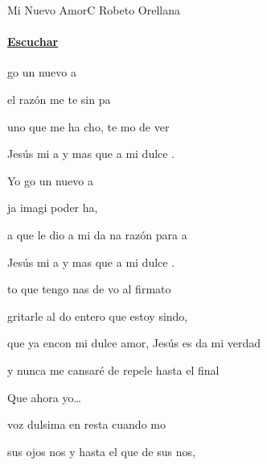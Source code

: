 \documentclass[12pt, spanish]{book}
\begin{document}
    \begin{song}{Mi Nuevo Amor}{C}
    {} %
    {Robeto Orellana}
    {} %
    {}
        \ifChordBk
        \paragraph{\mbox{}\hfill\protect\href{https://open.spotify.com/intl-es/track/7C0h8Ix74TmDAWd2pO4MYT}{Escuchar}\mbox{}\hfill}
        \fi


        \begin{SBChorus}
             go un nuevo a

            el razón me te sin pa

             uno que me ha cho, te mo de ver

            Jesús mi a y mas que a mi dulce .

            Yo go un nuevo a

            ja imagi poder ha,

            a que le dio a mi da na razón para a

            Jesús mi a y mas que a mi dulce .
        \end{SBChorus}

        \begin{SBOpGroup}
            to que tengo nas de vo al firmato

            gritarle al do entero  que estoy sindo,

            que ya encon mi dulce amor, Jesús es da mi verdad

            y nunca  me cansaré de repele hasta el final

            Que ahora yo\ldots
        \end{SBOpGroup}

        \begin{SBOpGroup}
             voz dulsima en resta cuando mo

            sus ojos nos y hasta el que de sus nos,


\end{SBOpGroup}
\end{song}
\end{document}
